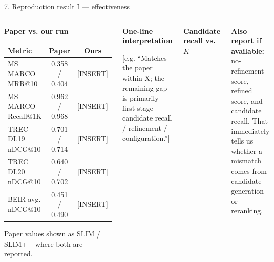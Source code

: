 \documentclass[aspectratio=169,9pt]{beamer}
\begin{document}
\begin{frame}[t]{7. Reproduction result I — effectiveness}
\begin{columns}[T,totalwidth=\textwidth]
\begin{darkbox}
\scriptsize
\textbf{Paper vs. our run}\par\smallskip
\renewcommand{\arraystretch}{1.18}
\begin{tabularx}{\linewidth}{>{\raggedright\arraybackslash}Xcc}
\toprule
Metric & Paper & Ours \\
\midrule
MS MARCO MRR@10 & 0.358 / 0.404 & \textcolor{amber}{[INSERT]} \\
MS MARCO Recall@1K & 0.962 / 0.968 & \textcolor{amber}{[INSERT]} \\
TREC DL19 nDCG@10 & 0.701 / 0.714 & \textcolor{amber}{[INSERT]} \\
TREC DL20 nDCG@10 & 0.640 / 0.702 & \textcolor{amber}{[INSERT]} \\
BEIR avg. nDCG@10 & 0.451 / 0.490 & \textcolor{amber}{[INSERT]} \\
\bottomrule
\end{tabularx}
\smallskip
{\color{muted}\fontsize{5.8}{6.6}\selectfont Paper values shown as SLIM / SLIM++ where both are reported.}
\end{darkbox}
\vspace{0.10cm}
\begin{violetbox}
\scriptsize
\textbf{One-line interpretation}\par
\textcolor{amber}{[e.g. “Matches the paper within X; the remaining gap is primarily first-stage candidate recall / refinement / configuration.”]}
\end{violetbox}

\begin{cyanbox}
\scriptsize\textbf{Candidate recall vs. $K$}\par\smallskip
\centering
{}
\end{cyanbox}
\vspace{0.10cm}
\begin{darkbox}
\scriptsize
\textbf{Also report if available:} no-refinement score, refined score, and candidate recall. That immediately tells us whether a mismatch comes from candidate generation or reranking.
\end{darkbox}
\end{columns}
\end{frame}
\end{document}
